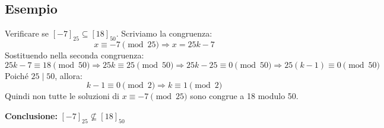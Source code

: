 \documentclass[a4paper,12pt]{article}
\begin{document}
\subsection*{Esempio}
Verificare se \([-7]_{25} \subseteq [18]_{50}\).  
Scriviamo la congruenza:
\[
x \equiv -7 \pmod{25}
\Rightarrow x = 25k - 7
\]
Sostituendo nella seconda congruenza:
\[
25k - 7 \equiv 18 \pmod{50}
\Rightarrow 25k \equiv 25 \pmod{50}
\Rightarrow 25k - 25 \equiv 0 \pmod{50}
\Rightarrow 25(k - 1) \equiv 0 \pmod{50}
\]
Poiché \(25 \mid 50\), allora:
\[
k - 1 \equiv 0 \pmod{2} \Rightarrow k \equiv 1 \pmod{2}
\]
Quindi non tutte le soluzioni di \(x \equiv -7 \pmod{25}\) sono congrue a 18 modulo 50.

\textbf{Conclusione:} \([-7]_{25} \not\subseteq [18]_{50}\)
\end{document}
